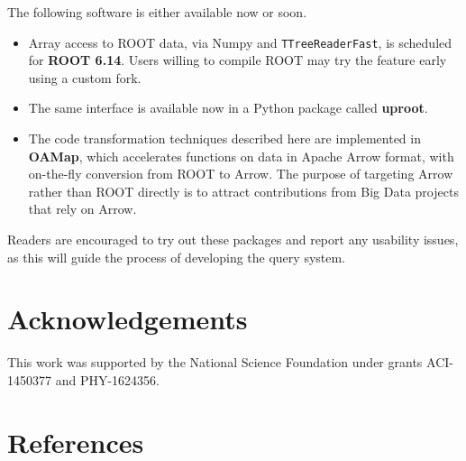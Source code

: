 \documentclass[a4paper]{jpconf}
\begin{document}
The following software is either available now or soon.
\begin{itemize}
\item Array access to ROOT data, via Numpy and {\tt TTreeReaderFast}, is scheduled for {\bf ROOT 6.14}\cite{root}. Users willing to compile ROOT may try the feature early using a custom fork\cite{root-brian}.
\item The same interface is available now in a Python package called {\bf uproot}\cite{uproot}.
\item The code transformation techniques described here are implemented in {\bf OAMap}\cite{oamap}, which accelerates functions on data in Apache Arrow\cite{arrow} format, with on-the-fly conversion from ROOT to Arrow. The purpose of targeting Arrow rather than ROOT directly is to attract contributions from Big Data projects that rely on Arrow.
\end{itemize}

Readers are encouraged to try out these packages and report any usability issues, as this will guide the process of developing the query system.

\section*{Acknowledgements}

This work was supported by the National Science Foundation under grants ACI-1450377 and PHY-1624356.

\section*{References}



\end{document}
